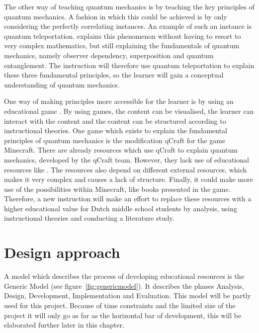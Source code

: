 \documentclass[12pt]{report} %
\begin{document}
The other way of teaching quantum mechanics is by teaching the key principles of quantum mechanics. A fashion in which this could be achieved is by only considering the perfectly correlating instances. An example of such an instance is quantum teleportation.  explains this phenomenon without having to resort to very complex mathematics, but still explaining the fundamentals of quantum mechanics, namely observer dependency, superposition and quantum entanglement. The instruction will therefore use quantum teleportation to explain these three fundamental principles, so the learner will gain a conceptual understanding of quantum mechanics.

One way of making principles more accessible for the learner is by using an educational game \cite{wouters}. By using games, the content can be visualised, the learner can interact with the content and the content can be structured according to instructional theories. One game which exists to explain the fundamental principles of quantum mechanics is the modification qCraft for the game Minecraft. There are already resources which use qCraft to explain quantum mechanics, developed by the qCraft team. However, they lack use of educational resources like . The resources also depend on different external resources, which makes it very complex and causes a lack of structure. Finally, it could make more use of the possibilities within Minecraft, like books presented in the game. Therefore, a new instruction will make an effort to replace these resources with a higher educational value for Dutch middle school students by analysis, using instructional theories and conducting a literature study.

\chapter{Design approach}

A model which describes the process of developing educational resources is the Generic Model \cite{genericmodel} (see figure~\ref{fig:genericmodel}). It describes the phases Analysis, Design, Development, Implementation and Evaluation. This model will be partly used for this project. Because of time constraints and the limited size of the project it will only go as far as the horizontal bar of development, this will be elaborated further later in this chapter.
\end{document}
